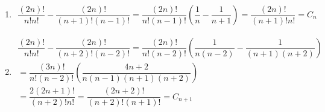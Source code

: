 \documentclass{tufte-handout}
\begin{document}
\setcounter{ans}{4}
\begin{ans}\hspace{1cm}
  \begin{enumerate}[label=(\alph*)]
    \item

      \begin{equation*}
        \begin{gathered}
          \dfrac{(2n)!}{n!n!}-\dfrac{(2n)!}{(n+1)!(n-1)!} = \dfrac{(2n)!}{n!(n-1)!}\left(\dfrac{1}{n}-\dfrac{1}{n+1}\right) = \dfrac{(2n)!}{(n+1)!n!} = C_n
        \end{gathered}
      \end{equation*}
      \par\bigskip
    \item 

      \begin{equation*}
        \begin{gathered}
          \dfrac{(2n)!}{n!n!}-\dfrac{(2n)!}{(n+2)!(n-2)!}=\dfrac{(2n)!}{n!(n-2)!}\left(\dfrac{1}{n(n-2)}-\dfrac{1}{(n+1)(n+2)}\right)\\
          = \dfrac{(3n)!}{n!(n-2)!}\left(\dfrac{4n+2}{n(n-1)(n+1)(n+2)}\right)\\
          = \dfrac{2(2n+1)!}{(n+2)!n!} = \dfrac{(2n+2)!}{(n+2)!(n+1)!} = C_{n+1}
        \end{gathered}
      \end{equation*}
  \end{enumerate}
\end{ans}
\end{document}
